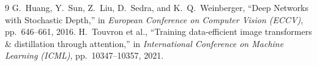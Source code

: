\documentclass[11pt,a4paper]{article}
\theoremstyle{definition}
\begin{document}
\begin{thebibliography}{9}
 G.~Huang, Y.~Sun, Z.~Liu, D.~Sedra, and K.~Q.~Weinberger, ``Deep Networks with Stochastic Depth,'' in \emph{European Conference on Computer Vision (ECCV)}, pp.~646--661, 2016.
 H.~Touvron et al., ``Training data-efficient image transformers \& distillation through attention,'' in \emph{International Conference on Machine Learning (ICML)}, pp.~10347--10357, 2021.
\end{thebibliography}
\end{document}
